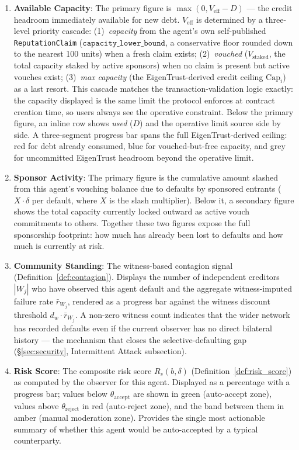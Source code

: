 \documentclass[11pt]{article}
\begin{document}
\begin{enumerate}
    \item \textbf{Available Capacity}: The primary figure is $\max(0, V_{\text{eff}} - D)$ --- the credit headroom immediately available for new debt. $V_{\text{eff}}$ is determined by a three-level priority cascade: (1)~\emph{capacity} from the agent's own self-published \texttt{ReputationClaim} ($\texttt{capacity\_lower\_bound}$, a conservative floor rounded down to the nearest 100 units) when a fresh claim exists; (2)~\emph{vouched} ($V_{\text{staked}}$, the total capacity staked by active sponsors) when no claim is present but active vouches exist; (3)~\emph{max capacity} (the EigenTrust-derived credit ceiling $\text{Cap}_i$) as a last resort. This cascade matches the transaction-validation logic exactly: the capacity displayed is the same limit the protocol enforces at contract creation time, so users always see the operative constraint. Below the primary figure, an inline row shows \emph{used} ($D$) and the operative limit source side by side. A three-segment progress bar spans the full EigenTrust-derived ceiling: red for debt already consumed, blue for vouched-but-free capacity, and grey for uncommitted EigenTrust headroom beyond the operative limit.

    \item \textbf{Sponsor Activity}: The primary figure is the cumulative amount slashed from this agent's vouching balance due to defaults by sponsored entrants ($X \cdot \delta$ per default, where $X$ is the slash multiplier). Below it, a secondary figure shows the total capacity currently locked outward as active vouch commitments to others. Together these two figures expose the full sponsorship footprint: how much has already been lost to defaults and how much is currently at risk.

    \item \textbf{Community Standing}: The witness-based contagion signal (Definition~\ref{def:contagion}). Displays the number of independent creditors $|W_j|$ who have observed this agent default and the aggregate witness-imputed failure rate $\bar{r}_{W_j}$, rendered as a progress bar against the witness discount threshold $d_w \cdot \bar{r}_{W_j}$. A non-zero witness count indicates that the wider network has recorded defaults even if the current observer has no direct bilateral history --- the mechanism that closes the selective-defaulting gap (§\ref{sec:security}, Intermittent Attack subsection).

    \item \textbf{Risk Score}: The composite risk score $R_s(b, \delta)$ (Definition~\ref{def:risk_score}) as computed by the observer for this agent. Displayed as a percentage with a progress bar; values below $\theta_{\text{accept}}$ are shown in green (auto-accept zone), values above $\theta_{\text{reject}}$ in red (auto-reject zone), and the band between them in amber (manual moderation zone). Provides the single most actionable summary of whether this agent would be auto-accepted by a typical counterparty.


\end{enumerate}
\end{document}
